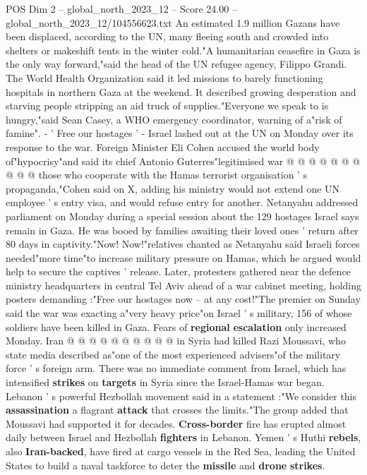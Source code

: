 \begin{textsample}{POS Dim 2 – global\_north\_2023\_12 – Score 24.00 – global\_north\_2023\_12/104556623.txt}
An estimated 1.9 million Gazans have been displaced, according to the UN, many fleeing south and crowded into shelters or makeshift tents in the winter cold."A humanitarian ceasefire in Gaza is the only way forward,"said the head of the UN refugee agency, Filippo Grandi.
The World Health Organization said it led missions to barely functioning hospitals in northern Gaza at the weekend.
It described growing desperation and starving people stripping an aid truck of supplies."Everyone we speak to is hungry,"said Sean Casey, a WHO emergency coordinator, warning of a"risk of famine". - ' Free our hostages ' - Israel lashed out at the UN on Monday over its response to the war.
Foreign Minister Eli Cohen accused the world body of"hypocrisy"and said its chief Antonio Guterres"legitimised war @ @ @ @ @ @ @ @ @ @ those who cooperate with the Hamas terrorist organisation ' s propaganda,"Cohen said on X, adding his ministry would not extend one UN employee ' s entry visa, and would refuse entry for another.
Netanyahu addressed parliament on Monday during a special session about the 129 hostages Israel says remain in Gaza.
He was booed by families awaiting their loved ones ' return after 80 days in captivity."Now!
Now!"relatives chanted as Netanyahu said Israeli forces needed"more time"to increase military pressure on Hamas, which he argued would help to secure the captives ' release.
Later, protesters gathered near the defence ministry headquarters in central Tel Aviv ahead of a war cabinet meeting, holding posters demanding :"Free our hostages now -- at any cost!"The premier on Sunday said the war was exacting a"very heavy price"on Israel ' s military, 156 of whose soldiers have been killed in Gaza.
Fears of \textbf{regional} \textbf{escalation} only increased Monday.
Iran @ @ @ @ @ @ @ @ @ @ in Syria had killed Razi Moussavi, who state media described as"one of the most experienced advisers"of the military force ' s foreign arm.
There was no immediate comment from Israel, which has intensified \textbf{strikes} on \textbf{targets} in Syria since the Israel-Hamas war began.
Lebanon ' s powerful Hezbollah movement said in a statement :"We consider this \textbf{assassination} a flagrant \textbf{attack} that crosses the limits."The group added that Moussavi had supported it for decades. \textbf{Cross-border} fire has erupted almost daily between Israel and Hezbollah \textbf{fighters} in Lebanon.
Yemen ' s Huthi \textbf{rebels}, also \textbf{Iran-backed}, have fired at cargo vessels in the Red Sea, leading the United States to build a naval taskforce to deter the \textbf{missile} and \textbf{drone} \textbf{strikes}.

\end{textsample}
